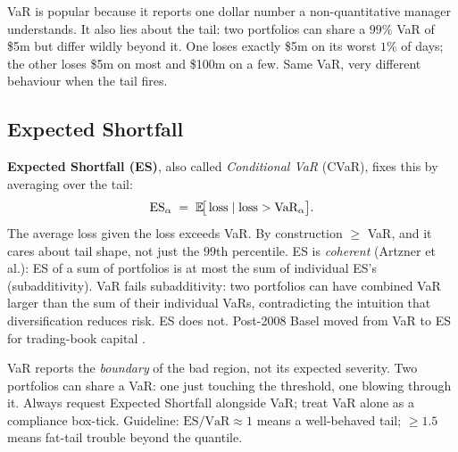 VaR is popular because it reports one dollar number a
non-quantitative manager understands. It also lies about the
tail: two portfolios can share a $99\%$ VaR of \$5m but differ
wildly beyond it. One loses exactly \$5m on its worst $1\%$
of days; the other loses \$5m on most and \$100m on a few. Same
VaR, very different behaviour when the tail fires.

\subsection{Expected Shortfall}

\textbf{Expected Shortfall (ES)}, also called
\emph{Conditional VaR} (CVaR), fixes this by averaging over the
tail:
\begin{equation}
  \text{ES}_\alpha \;=\;
  \mathbb{E}\!\bigl[\,\text{loss} \mid \text{loss} > \text{VaR}_\alpha\bigr].
\end{equation}
The average loss given the loss exceeds VaR. By construction
$\geq$ VaR, and it cares about tail shape, not just the $99$th
percentile. ES is \emph{coherent} (Artzner et al.): ES of a sum
of portfolios is at most the sum of individual ES's
(subadditivity). VaR fails subadditivity: two portfolios can
have combined VaR larger than the sum of their individual VaRs,
contradicting the intuition that diversification reduces risk.
ES does not. Post-2008 Basel moved from VaR to ES for
trading-book capital \citeHull.

\begin{pitfallbox}
VaR reports the \emph{boundary} of the bad region, not its
expected severity. Two portfolios can share a VaR: one just
touching the threshold, one blowing through it. Always request
Expected Shortfall alongside VaR; treat VaR alone as a compliance
box-tick. Guideline: $\text{ES}/\text{VaR} \approx 1$ means a
well-behaved tail; $\geq 1.5$ means fat-tail trouble beyond the
quantile.
\end{pitfallbox}

